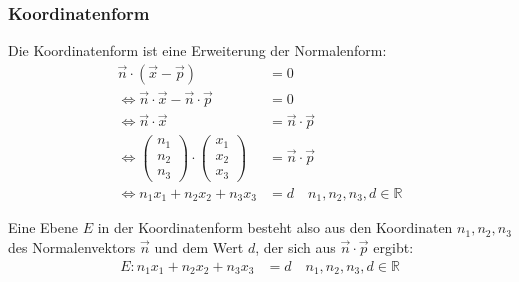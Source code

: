 \subsubsection{Koordinatenform}
\begin{flushleft}
Die Koordinatenform ist eine Erweiterung der Normalenform:
\begin{align}
    \vec{n}\cdot\left(\vec{x}-\vec{p}\right)&=0 \\
    \Leftrightarrow \vec{n}\cdot\vec{x}-\vec{n}\cdot\vec{p}&=0 \\
    \Leftrightarrow \vec{n}\cdot\vec{x}&=\vec{n}\cdot\vec{p} \\
    \Leftrightarrow \begin{pmatrix}n_1 \\ n_2 \\ n_3 \end{pmatrix}\cdot\begin{pmatrix}x_1 \\ x_2 \\ x_3 \end{pmatrix}&=\vec{n}\cdot\vec{p} \\
    \Leftrightarrow n_1x_1+n_2x_2+n_3x_3&=d \quad n_1,n_2,n_3,d\in\mathbb{R}
\end{align}

Eine Ebene $E$ in der Koordinatenform besteht also aus den Koordinaten $n_1, n_2, n_3$ des Normalenvektors $\vec{n}$ und dem Wert $d$, der sich aus $\vec{n}\cdot\vec{p}$ ergibt:
\begin{align}
    E\colon n_1x_1+n_2x_2+n_3x_3&=d \quad n_1,n_2,n_3,d\in\mathbb{R}
\end{align}
\end{flushleft}

